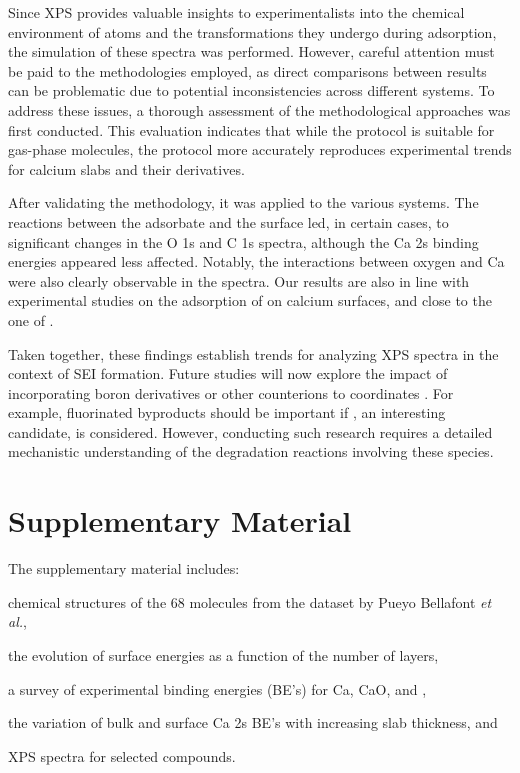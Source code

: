\documentclass[%
aip,
amsmath,amssymb,
preprint,%
jcp,
showkeys,
]{revtex4-2}
\begin{document}
Since XPS provides valuable insights  to experimentalists into the chemical environment of atoms and the transformations they undergo during adsorption, the simulation of these spectra was performed. However, careful attention must be paid to the methodologies employed, as direct comparisons between results can be problematic due to potential inconsistencies across different systems. To address these issues, a thorough assessment of the methodological approaches was first conducted. This evaluation indicates that while the  protocol is suitable for gas-phase molecules, the  protocol more accurately reproduces experimental trends for calcium slabs and their derivatives.

After validating the methodology, it was applied to the various systems. The reactions between the adsorbate and the surface led,  in certain cases, to significant changes in the O 1s and C 1s spectra, although the Ca 2s binding energies appeared less affected. Notably, the interactions between oxygen and Ca were also clearly observable in the spectra. Our results are also in line with experimental studies on the adsorption of  on calcium surfaces, and close to the one of .\cite{voigtsAdsorptionCO2CO2009}

Taken together, these findings establish trends for analyzing XPS spectra in the context of SEI formation. Future studies will now explore the impact of incorporating boron derivatives or other counterions to coordinates . For example, fluorinated byproducts should be important if  , an interesting candidate,\cite{bodinBoronBasedFunctionalAdditives2023} is considered. However, conducting such research requires a detailed mechanistic understanding of the degradation reactions involving these species.\cite{youngPreventingElectrolyteDecomposition2021,yamijalaStabilityCalciumIon2021,baonguyenInvestigatingAbnormalConductivity2022,nguyenSolvationReductionCoupling2023}


\section*{Supplementary Material}

The supplementary material includes: \begin{inparaenum}[(i)]
	\item chemical structures of the 68 molecules from the dataset by Pueyo Bellafont \textit{et al.}\cite{pueyobellafontPredictingCoreLevel2017},
	\item the evolution of surface energies as a function of the number of layers,
	\item a survey of experimental binding energies (BE's) for Ca, CaO, and ,
	\item the variation of bulk and surface Ca 2s BE's with increasing slab thickness, and
	\item XPS spectra for selected compounds.
\end{inparaenum}
\end{document}

